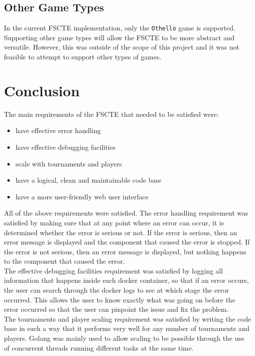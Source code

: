 \documentclass[a4paper, 11pt]{report}
\begin{document}
\section{Other Game Types}

In the current FSCTE implementation, only the \texttt{Othello} game is supported.
Supporting other game types will allow the FSCTE to be more abstract and versatile.
However, this was outside of the scope of this project and it was not feasible
to attempt to support other types of games.

\chapter{Conclusion}
\label{chap:conclusion}

The main requirements of the FSCTE that needed to be satisfied were:
\begin{itemize}
	\item have effective error handling
	\item have effective debugging facilities
	\item scale with tournaments and players
	\item have a logical, clean and maintainable code base
	\item have a more user-friendly web user interface
\end{itemize}
All of the above requirements were satisfied. The error handling requirement
was satisfied by making sure that at any point where an error can occur, it
is determined whether the error is serious or not. If the error is serious, then
an error message is displayed and the component that caused the error is stopped.
If the error is not serious, then an error message is displayed, but nothing
happens to the component that caused the error. \\

The effective debugging facilities requirement was satisfied by logging all
information that happens inside each docker container, so that if an error
occurs, the user can search through the docker logs to see at which stage the
error occurred. This allows the user to know exactly what was going on before
the error occurred so that the user can pinpoint the issue and fix the problem. \\

The tournaments and player scaling requirement was satisfied by writing the
code base in such a way that it performs very well for any number of tournaments
and players. Golang was mainly used to allow scaling to be possible through the
use of concurrent threads running different tasks at the same time. \\
\end{document}
